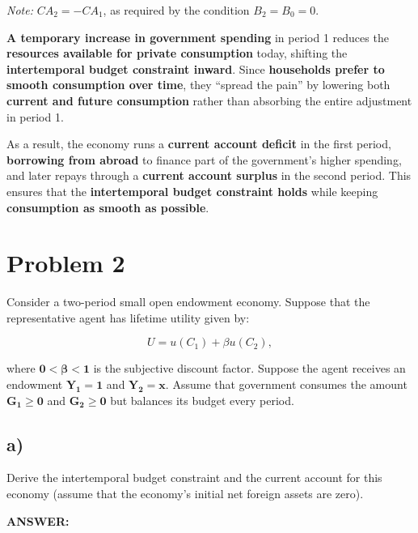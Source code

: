 \documentclass[12pt]{article}
\begin{document}
\textit{Note: } \( CA_2 = -CA_1 \), as required by the condition \( B_2 = B_0 = 0 \).

\doublespacing

\textbf{A temporary increase in government spending} in period 1 reduces the \textbf{resources available for private consumption} today, shifting the \textbf{intertemporal budget constraint inward}. Since \textbf{households prefer to smooth consumption over time}, they “spread the pain” by lowering both \textbf{current and future consumption} rather than absorbing the entire adjustment in period 1.

As a result, the economy runs a \textbf{current account deficit} in the first period, \textbf{borrowing from abroad} to finance part of the government’s higher spending, and later repays through a \textbf{current account surplus} in the second period. This ensures that the \textbf{intertemporal budget constraint holds} while keeping \textbf{consumption as smooth as possible}.


\newpage

\section*{\noindent\textbf{Problem 2}}

Consider a two-period small open endowment economy. Suppose that the representative agent has lifetime utility given by:

\[
U = u(C_1) + \beta u(C_2),
\]

where \(\mathbf{0 < \beta < 1}\) is the subjective discount factor. Suppose the agent receives an endowment \(\mathbf{Y_1 = 1}\) and \(\mathbf{Y_2 = x}\). Assume that government consumes the amount \(\mathbf{G_1 \geq 0}\) and \(\mathbf{G_2 \geq 0}\) but balances its budget every period.

\subsection*{\noindent\textbf{a)}}

Derive the intertemporal budget constraint and the current account for this economy
(assume that the economy’s initial net foreign assets are zero).

\vspace{0.5em}
\noindent\textcolor{formalred}{\textbf{ANSWER:}}

\singlespacing
\end{document}
